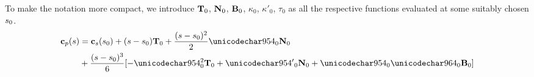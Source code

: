 To make the notation more compact, we introduce $\mathbf{T}_0$, $\mathbf{N}_0$, $\mathbf{B}_0$, $\kappa_0$, ${\kappa'}_0$, $\tau_0$ as all the respective functions evaluated at some suitably chosen $s_0$.
\begin{equation}
\begin{split}
 \satp(\parm) &= \sats(\parm_0) + (\parm-\parm_0)\vct{T}_0 +  \frac{(\parm-\parm_0)^2}{2}\kappa_0\vct{N}_0\\
 &+ \frac{(\parm-\parm_0)^3}{6}[-\kappa^2_0\vct{T}_0 + {\kappa'}_0\vct{N}_0 + \kappa_0\tau_0\vct{B}_0]
 \end{split}
 \label{eq:diffgeoeqn}
\end{equation}
